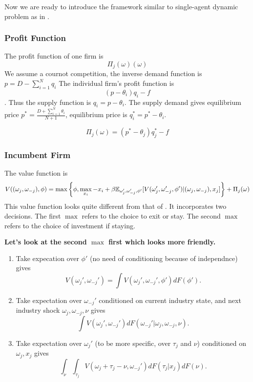 \documentclass[12pt]{article}[margin=1in]
\begin{document}
Now we are ready to introduce the framework similar to single-agent dynamic problem as in \citet{rust1987optimal}. 
\subsubsection{Profit Function}
The profit function of one firm is
\begin{equation*}
    \Pi_j(\omega)(\omega)
\end{equation*}
We assume a cournot competition, the inverse demand function is 
$p = D-\sum_{i=1}^N q_i$
The individual firm's profit function is $$ (p-\theta_i)q_i-f$$. Thus the supply function is $q_i=p-\theta_i$. The supply demand gives equilibrium price $p^*=\frac{D+\sum_{i=1}^N \theta_i}{N+1}$, equilibrium price is $q_i^*=p^*-\theta_i$.

\begin{equation*}
    \Pi_j(\omega)=(p^*-\theta_j)q_j^*-f
\end{equation*}


\subsubsection{Incumbent Firm}
The value function is
\begin{equation*}
    \begin{split}
        V((\omega_j, \omega_{-j}),\phi) & = \max\left\{\phi,\max_{x_i}-x_i+\beta\mathbb{E}_{\omega_j',\omega_{-j}',\phi'}[V(\omega_j',\omega_{-j}',\phi')|(\omega_j, \omega_{-j}),x_j]\right\} + \Pi_j(\omega)\\
    \end{split}
\end{equation*}
 This value function looks quite different from that of \citet{rust1987optimal}. It incorporates two decisions. The first $\max$ refers to the choice to exit or stay. The second $\max$ refers to the choice of investment if staying.

\textbf{Let's look at the second $\max$ first which looks more friendly.}

\begin{enumerate}
    \item Take expecation over $\phi'$ (no need of conditioning because of independnce) gives $$V(\omega_j',\omega_{-j}')=\int V(\omega_j', \omega_{-j}', \phi')dF(\phi').$$
    \item Take expectation over $\omega_{-j}'$ conditioned on current industry state, and next industry shock $\omega_j,\omega_{-j},\nu$ gives $$\int V(\omega_j', \omega_{-j}')dF(\omega_{-j}'|\omega_j,\omega_{-j},\nu).$$
    \item Take expectation over $\omega_j'$ (to be more specific, over $\tau_j$ and $\nu$) conditioned on $\omega_j,x_j$ gives $$\int_\nu \int_{\tau_j} V(\omega_j+\tau_j-\nu, \omega_{-j}')dF(\tau_j|x_j)dF(\nu).$$
\end{enumerate}
\end{document}
